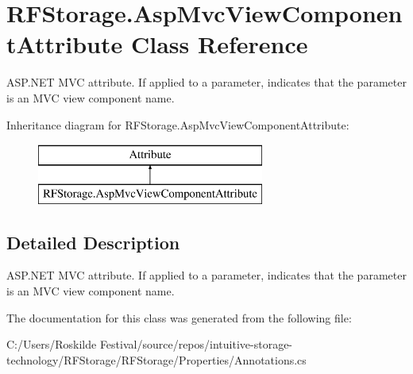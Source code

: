 \hypertarget{class_r_f_storage_1_1_asp_mvc_view_component_attribute}{}\section{R\+F\+Storage.\+Asp\+Mvc\+View\+Component\+Attribute Class Reference}
\label{class_r_f_storage_1_1_asp_mvc_view_component_attribute}


A\+S\+P.\+N\+ET M\+VC attribute. If applied to a parameter, indicates that the parameter is an M\+VC view component name.  


Inheritance diagram for R\+F\+Storage.\+Asp\+Mvc\+View\+Component\+Attribute\+:\begin{figure}[H]
\begin{center}
\leavevmode
\includegraphics[height=2.000000cm]{class_r_f_storage_1_1_asp_mvc_view_component_attribute}
\end{center}
\end{figure}


\subsection{Detailed Description}
A\+S\+P.\+N\+ET M\+VC attribute. If applied to a parameter, indicates that the parameter is an M\+VC view component name. 



The documentation for this class was generated from the following file\+:\begin{DoxyCompactItemize}
\item 
C\+:/\+Users/\+Roskilde Festival/source/repos/intuitive-\/storage-\/technology/\+R\+F\+Storage/\+R\+F\+Storage/\+Properties/Annotations.\+cs\end{DoxyCompactItemize}
